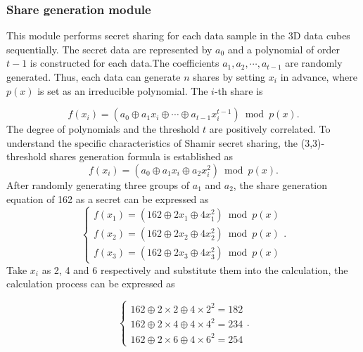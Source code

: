 \subsubsection{Share generation module}\label{subsec_NC-BPDVC_framework}

This module performs secret sharing for each data sample in the 3D data cubes sequentially. The secret data are represented by $a_{0}$ and a polynomial of order $t-1$ is constructed for each data.The coefficients $a_{1},a_{2},\cdots,a_{t-1}$ are randomly generated. Thus, each data can generate $n$ shares by setting $x_{i}$ in advance, where $p(x)$ is set as an irreducible polynomial. The $i$-th share is

\begin{equation}
f(x_{i}) =\left(a_{0}  \oplus a_{1} x_{i} \oplus \cdots \oplus a_{t-1} x_{i}^{t-1}\right) \bmod p(x).
\end{equation}The degree of polynomials and the threshold $t$ are positively correlated. To understand the specific characteristics of Shamir secret sharing, the (3,3)-threshold shares generation formula is established as
\begin{equation}
f\left(x_{i}\right)=\left(a_{0}\oplus a_{1} x_{i}\oplus a_{2} x_{i}^{2}\right) \bmod p(x).
\end{equation}After randomly generating three groups of $a_1$ and $a_2$, the share generation equation of 162 as a secret can be expressed as
\begin{equation}
\left\{\begin{array}{l}
f\left(x_{1}\right)=\left(162\oplus 2 x_{1}\oplus 4 x_{1}^{2}\right) \bmod p(x) \\
f\left(x_{2}\right)=\left(162\oplus 2 x_{2}\oplus 4 x_{2}^{2}\right) \bmod p(x) \\
f\left(x_{3}\right)=\left(162\oplus 2 x_{3}\oplus 4 x_{3}^{2}\right) \bmod p(x)
\end{array}\right..
\end{equation}Take $x_{i} $ as 2, 4 and 6 respectively and substitute them into the calculation, the calculation process can be expressed as

\begin{equation}
\left\{\begin{array}{l}
162 \oplus 2 \times 2 \oplus 4 \times 2^{2}=182 \\
162 \oplus 2 \times 4 \oplus 4 \times 4^{2}=234 \\
162 \oplus 2 \times 6 \oplus 4 \times 6^{2}=254
\end{array}\right..
\end{equation}


